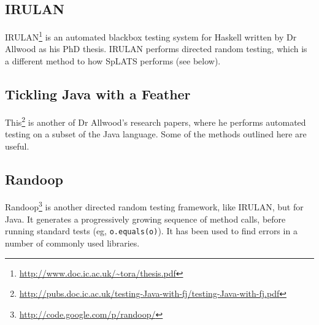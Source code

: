   \subsection{IRULAN}
    IRULAN\footnote{\url{http://www.doc.ic.ac.uk/~tora/thesis.pdf}} is an automated blackbox testing system for Haskell written by Dr Allwood as his PhD thesis.
    IRULAN performs directed random testing, which is a different method to how SpLATS performs (see below).

  \subsection{Tickling Java with a Feather}
    This\footnote{\url{http://pubs.doc.ic.ac.uk/testing-Java-with-fj/testing-Java-with-fj.pdf}} is another of Dr Allwood's research papers, where he performs automated testing on a subset of the Java language.
    Some of the methods outlined here are useful.

  \subsection{Randoop}
    Randoop\footnote{\url{http://code.google.com/p/randoop/}} is another directed random testing framework, like IRULAN, but for Java.
    It generates a progressively growing sequence of method calls, before running standard tests (eg, \verb|o.equals(o)|).
    It has been used to find errors in a number of commonly used libraries.
